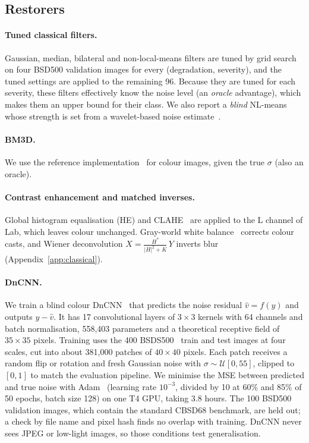 \documentclass[11pt]{article}
\begin{document}
\subsection{Restorers}
\label{sec:restorers}

\paragraph{Tuned classical filters.} Gaussian, median, bilateral and non-local-means filters are tuned by grid search on four BSD500 validation images for every (degradation, severity), and the tuned settings are applied to the remaining 96. Because they are tuned for each severity, these filters effectively know the noise level (an \emph{oracle} advantage), which makes them an upper bound for their class. We also report a \emph{blind} NL-means whose strength is set from a wavelet-based noise estimate~\citep{donoho1994wavelet}.

\paragraph{BM3D.} We use the reference implementation~\citep{dabov2007bm3d} for colour images, given the true $\sigma$ (also an oracle).

\paragraph{Contrast enhancement and matched inverses.} Global histogram equalisation (HE) and CLAHE~\citep{zuiderveld1994clahe} are applied to the L channel of Lab, which leaves colour unchanged. Gray-world white balance~\citep{buchsbaum1980grayworld} corrects colour casts, and Wiener deconvolution $\hat{X} = \frac{H^*}{|H|^2 + K}\,Y$ inverts blur (Appendix~\ref{app:classical}).

\paragraph{DnCNN.} We train a blind colour DnCNN~\citep{zhang2017dncnn} that predicts the noise residual $\hat{v}=f(y)$ and outputs $y-\hat{v}$. It has 17 convolutional layers of $3\times3$ kernels with 64 channels and batch normalisation, 558{,}403 parameters and a theoretical receptive field of $35\times35$ pixels. Training uses the 400 BSDS500~\citep{arbelaez2011bsds500} train and test images at four scales, cut into about 381{,}000 patches of $40\times40$ pixels. Each patch receives a random flip or rotation and fresh Gaussian noise with $\sigma \sim \mathcal{U}[0,55]$, clipped to $[0,1]$ to match the evaluation pipeline. We minimise the MSE between predicted and true noise with Adam~\citep{kingma2015adam} (learning rate $10^{-3}$, divided by 10 at 60\% and 85\% of 50 epochs, batch size 128) on one T4 GPU, taking 3.8 hours. The 100 BSD500 validation images, which contain the standard CBSD68 benchmark, are held out; a check by file name and pixel hash finds no overlap with training. DnCNN never sees JPEG or low-light images, so those conditions test generalisation.
\end{document}
